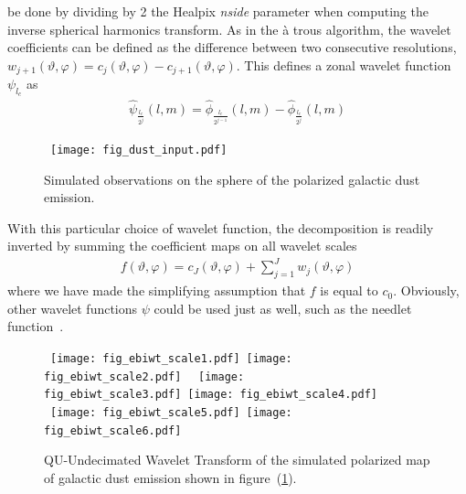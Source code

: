 be done by dividing by 2 the Healpix {\it nside} parameter when computing the inverse spherical harmonics transform. 
As in the \og{}\`a trous \fg{} algorithm, the wavelet coefficients can be defined as the difference between two consecutive resolutions, 
$w_{j+1}(\vartheta, \varphi) = c_{j}(\vartheta, \varphi) - c_{j+1}(\vartheta, \varphi)$. This defines a zonal wavelet function $\psi_{l_c}$ as 
\begin{eqnarray}
\hat \psi_{\frac{l_c}{2^{j}}}(l,m) = \hat \phi_{\frac{l_c}{2^{j-1}}} (l,m)  - \hat \phi_{\frac{l_c}{2^{j}}}(l,m)
\end{eqnarray}

\begin{figure*}[htb]
\centerline{
\hbox{
 \texttt{[image: fig\_dust\_input.pdf]}
}}
\caption{Simulated observations on the sphere of the polarized galactic dust emission.}
\label{fig_simu_pol_dust}
\end{figure*}

With this particular choice of wavelet function, the decomposition is readily inverted by summing the coefficient maps on all wavelet scales
 \begin{eqnarray}\label{IWT}
   f(\vartheta, \varphi) = c_{J}(\vartheta, \varphi) + \sum_{j=1}^{J} w_j(\vartheta, \varphi)
\end{eqnarray}
where we have made the simplifying assumption that $f$ is equal to $c_0$. Obviously, other wavelet functions $\psi$ could be used just as well, such as the needlet function~\citep{marinucci08}.


\begin{figure*}[htb]
\centerline{
\vbox{
 \hbox{
 \texttt{[image: fig\_ebiwt\_scale1.pdf]}
 \texttt{[image: fig\_ebiwt\_scale2.pdf]}
 }
 \hbox{
 \texttt{[image: fig\_ebiwt\_scale3.pdf]}
 \texttt{[image: fig\_ebiwt\_scale4.pdf]}
 }
  \hbox{
 \texttt{[image: fig\_ebiwt\_scale5.pdf]}
 \texttt{[image: fig\_ebiwt\_scale6.pdf]}
 }
  }
 }
\caption{QU-Undecimated Wavelet Transform of the simulated polarized map of galactic dust emission shown in figure~(\ref{fig_simu_pol_dust}).}
\label{fig_quwt_trans_dust}
\end{figure*}

